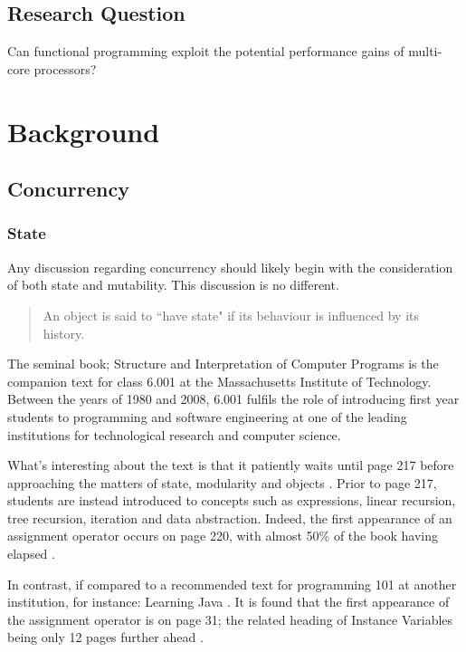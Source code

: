 \documentclass[12pt,a4paper]{article}
\begin{document}
\subsection{Research Question}

Can functional programming exploit the potential performance gains of multi-core processors? 

\newpage
\section{Background}

\subsection{Concurrency}

\subsubsection{State}

Any discussion regarding concurrency should likely begin with the consideration of both state and mutability. This discussion is no different.

\begin{quote}
    An object is said to ``have state" if its behaviour is influenced by its history. \cite{structureAndInterpretation}
\end{quote}

The seminal book; Structure and Interpretation of Computer Programs \cite{structureAndInterpretation} is the companion text for class 6.001 at the Massachusetts Institute of Technology. Between the years of 1980 and 2008, 6.001 fulfils the role of introducing first year students to programming and software engineering at one of the leading institutions for technological research and computer science.

What's interesting about the text is that it patiently waits until page 217 before approaching the matters of state, modularity and objects \cite{structureAndInterpretation}. Prior to page 217, students are instead introduced to concepts such as expressions, linear recursion, tree recursion, iteration and data abstraction. Indeed, the first appearance of an assignment operator occurs on page 220, with almost 50\% of the book having elapsed \cite{structureAndInterpretation}.

In contrast, if compared to a recommended text for programming 101 at another institution, for instance: Learning Java \cite{learningJava}. It is found that the first appearance of the assignment operator is on page 31; the related heading of Instance Variables being only 12 pages further ahead \cite{learningJava}.
\end{document}
